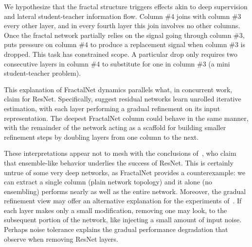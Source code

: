 We hypothesize that the fractal structure triggers effects akin to deep
supervision and lateral student-teacher information flow.  Column \#4 joins
with column \#3 every other layer, and in every fourth layer this join
involves no other columns.  Once the fractal network partially relies on the
signal going through column \#3, {\droppath} puts pressure on column \#4 to
produce a replacement signal when column \#3 is dropped.  This task has
constrained scope.  A particular drop only requires two consecutive layers in
column \#4 to substitute for one in column \#3 (a mini student-teacher
problem).

This explanation of FractalNet dynamics parallels what, in concurrent
work, \cite{unrolled} claim for ResNet.  Specifically, \cite{unrolled} suggest
residual networks learn unrolled iterative estimation, with each layer
performing a gradual refinement on its input representation.  The deepest
FractalNet column could behave in the same manner, with the remainder of the
network acting as a scaffold for building smaller refinement steps by doubling
layers from one column to the next.

These interpretations appear not to mesh with the conclusions of~\cite{
veit16residual}, who claim that ensemble-like behavior underlies the success of
ResNet.  This is certainly untrue of some very deep networks, as FractalNet
provides a counterexample: we can extract a single column (plain network
topology) and it alone (no ensembling) performs nearly as well as the entire
network.  Moreover, the gradual refinement view may offer an alternative
explanation for the experiments of~\cite{veit16residual}.  If each layer makes
only a small modification, removing one may look, to the subsequent portion of
the network, like injecting a small amount of input noise.  Perhaps noise
tolerance explains the gradual performance degradation that \cite{
veit16residual} observe when removing ResNet layers.
